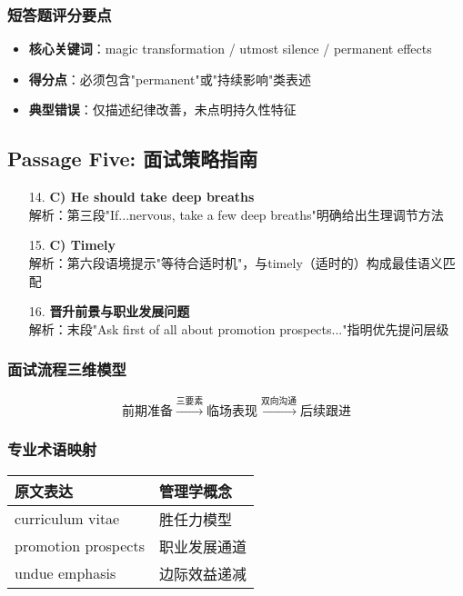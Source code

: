 \documentclass{article}
\begin{document}
\subsubsection*{短答题评分要点}
\begin{itemize}
    \item \textbf{核心关键词}：magic transformation / utmost silence / permanent effects
    \item \textbf{得分点}：必须包含"permanent"或"持续影响"类表述
    \item \textbf{典型错误}：仅描述纪律改善，未点明持久性特征
\end{itemize}

\subsection*{Passage Five: 面试策略指南}
\begin{enumerate}
    \item[14.] \textbf{C) He should take deep breaths} \\ 
    解析：第三段"If...nervous, take a few deep breaths"明确给出生理调节方法
    
    \item[15.] \textbf{C) Timely} \\ 
    解析：第六段语境提示"等待合适时机"，与timely（适时的）构成最佳语义匹配
    
    \item[16.] \textbf{晋升前景与职业发展问题} \\ 
    解析：末段"Ask first of all about promotion prospects..."指明优先提问层级
\end{enumerate}

\subsubsection*{面试流程三维模型}
\[
\text{前期准备} \xrightarrow{\text{三要素}} 
\text{临场表现} \xrightarrow{\text{双向沟通}} 
\text{后续跟进}
\]

\subsubsection*{专业术语映射}
\begin{tabular}{|l|l|}
\hline
\textbf{原文表达} & \textbf{管理学概念} \\
\hline
curriculum vitae & 胜任力模型 \\
promotion prospects & 职业发展通道 \\
undue emphasis & 边际效益递减 \\
\hline
\end{tabular}
\end{document}
